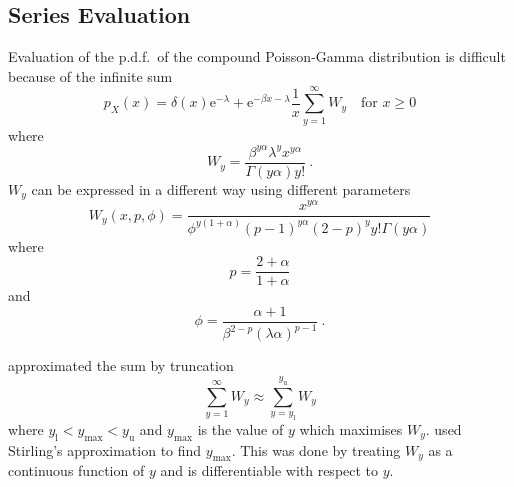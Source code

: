 \documentclass[12pt, a4paper]{memoir}
\newcommand{\euler}{\mathrm{e}}
\begin{document}
\subsection{Series Evaluation}
Evaluation of the p.d.f.~of the compound Poisson-Gamma distribution is difficult because of the infinite sum
\begin{equation}
p_X(x) = 
\delta(x) \euler^{-\lambda}
+
\euler^{-\beta x-\lambda}\frac{1}{x}\sum_{y=1}^{\infty}W_y
\quad\text{for }x\geqslant 0
\end{equation}
where
\begin{equation}
W_y = \frac{\beta^{y\alpha}\lambda^yx^{y\alpha}}{\Gamma(y\alpha)y!} \ .
\label{eq:compoundPoisson_Wy}
\end{equation}
$W_y$ can be expressed in a different way using different parameters
\begin{equation}
W_y(x,p,\phi)=\frac{x^{y\alpha}}{\phi^{y(1+\alpha)}(p-1)^{y\alpha}(2-p)^yy!\Gamma(y\alpha)}
\end{equation}
where
\begin{equation}
p=\frac{2+\alpha}{1+\alpha}
\end{equation}
and
\begin{equation}
\phi = \frac{\alpha+1}{\beta^{2-p}(\lambda\alpha)^{p-1}} \ .
\end{equation}

\cite{dunn2005series} approximated the sum by truncation
\begin{equation}
\sum_{y=1}^\infty W_y \approx \sum_{y=y_\text{l}}^{y_\text{u}}W_y
\end{equation}
where $y_\text{l}<y_{\text{max}}<y_\text{u}$ and $y_{\text{max}}$ is the value of $y$ which maximises $W_y$. \cite{dunn2005series} used Stirling's approximation to find $y_{\text{max}}$. This was done by treating $W_y$ as a continuous function of $y$ and is differentiable with respect to $y$.
\end{document}
